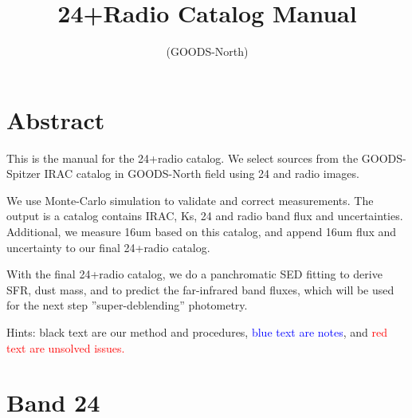 \documentclass[11pt,a4paper]{article}
\author{}
\title{24+Radio Catalog Manual}
\subtitle{(GOODS-North)}
\begin{document}
\maketitle
\tableofcontents
\clearpage
\setlength{\baselineskip}{16pt}
\setlength{\parskip}{5pt}

\section{Abstract}

This is the manual for the 24+radio catalog. We select sources from the GOODS-Spitzer IRAC catalog in GOODS-North field using 24 and radio images. 

We use Monte-Carlo simulation to validate and correct measurements. The output is a catalog contains IRAC, Ks, 24 and radio band flux and uncertainties. Additional, we measure 16um based on this catalog, and append 16um flux and uncertainty to our final 24+radio catalog. 

With the final 24+radio catalog, we do a panchromatic SED fitting to derive SFR, dust mass, and to predict the far-infrared band fluxes, which will be used for the next step ''super-deblending'' photometry. 

\vspace{5cm}
Hints: black text are our method and procedures, \textcolor{blue}{blue text are notes}, and \textcolor{red}{red text are unsolved issues.}


\clearpage


\clearpage

\section{Band 24}
\end{document}

